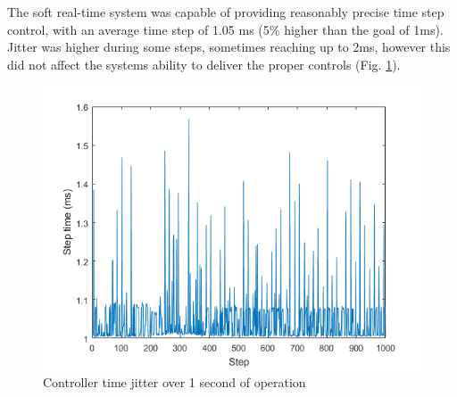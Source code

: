 \documentclass[12pt]{report}
\begin{document}
	  	The soft real-time system was capable of providing reasonably precise time step control, with an average time step of 1.05 ms (5\% higher than the goal of 1ms). Jitter was higher during some steps, sometimes reaching up to 2ms, however this did not affect the systems ability to deliver the proper controls (Fig. \ref{fig:jitter}). 


\begin{figure}[t] 
	\centering
	\includegraphics[width=0.9\linewidth]{time_jitter}
	\caption{Controller time jitter over 1 second of operation}
	\label{fig:jitter}
\end{figure}

	
\end{document}
